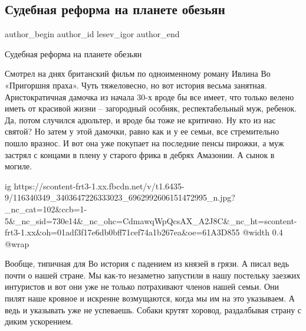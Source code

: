  
 
 
 
 
 
\subsection{Судебная реформа на планете обезьян}
\label{sec:28_07_2020.fb.lesev_igor.1.sudebnaja_reforma_planeta_obezjan}
 
\ifcmt
 author_begin
   author_id lesev_igor
 author_end
\fi

Судебная реформа на планете обезьян

Смотрел на днях британский фильм по одноименному роману Ивлина Во «Пригоршня
праха». Чуть тяжеловесно, но вот история весьма занятная. Аристократичная
дамочка из начала 30-х вроде бы все имеет, что только велено иметь от красивой
жизни – загородный особняк, респектабельный муж, ребенок. Да, потом случился
адюльтер, и вроде бы тоже не критично. Ну кто из нас святой? Но затем у этой
дамочки, равно как и у ее семьи, все стремительно пошло вразнос. И вот она уже
покупает на последние пенсы пирожки, а муж застрял с концами в плену у старого
фрика в дебрях Амазонии. А сынок в могиле.

\ifcmt
  ig https://scontent-frt3-1.xx.fbcdn.net/v/t1.6435-9/116340349_3403647226333023_6962992606151472995_n.jpg?_nc_cat=102&ccb=1-5&_nc_sid=730e14&_nc_ohc=CdmawqWpQcsAX_A2J8C&_nc_ht=scontent-frt3-1.xx&oh=01adf3f17e6db0bff71cef74a1b267ea&oe=61A3D855
  @width 0.4
  @wrap 
\fi

Вообще, типичная для Во история с падением из князей в грязи. А писал ведь
почти о нашей стране. Мы как-то незаметно запустили в нашу постельку заезжих
интуристов и вот они уже не только потрахивают членов нашей семьи. Они пилят
наше кровное и искренне возмущаются, когда мы им на это указываем. А ведь и
указывать уже не успеваешь. Собаки крутят хоровод, раздалбывая страну с диким
ускорением.


